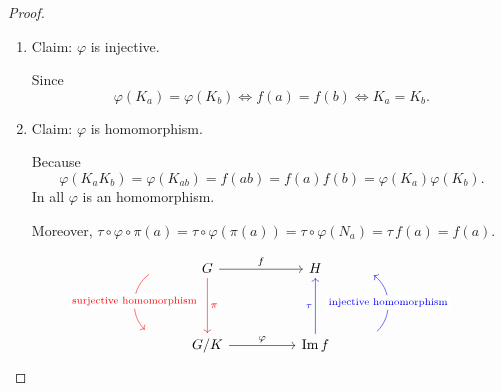 \begin{proof}
\begin{enumerate}
    \item Claim: $\varphi$ is injective. 

    Since 
    \[
        \varphi(K_a) = \varphi(K_b) \Leftrightarrow f(a) = f(b) \Leftrightarrow K_a = K_b.
    \]

    \item Claim: $\varphi$ is homomorphism.
    
    Because 
    \[
        \varphi(K_aK_b) = \varphi(K_{ab}) = f(ab) = f(a) f(b) = \varphi(K_a) \varphi(K_b).
    \]
    In all $\varphi$ is an homomorphism. 

    Moreover, $\tau \circ \varphi \circ \pi(a) = \tau \circ \varphi(\pi(a)) = \tau \circ \varphi(N_a) = \tau \, f(a) = f(a)$.

    \end{enumerate}
    \[
        \begin{tikzcd}[row sep=2.0em]
            G \arrow["f"]{rr} \arrow[red, "\pi"]{dd} \arrow[bend right=50, red, "\text{surjective homomorphism}" description,  shift right=8ex]{dd} & & H \\
            \\
            G/K \arrow["\varphi"]{rr} & & \Ima f \arrow[blue, "\tau"]{uu} \arrow[bend right=50, blue, "\text{injective homomorphism}" description,  shift right=8ex]{uu}
        \end{tikzcd}
    \]
\end{proof}

